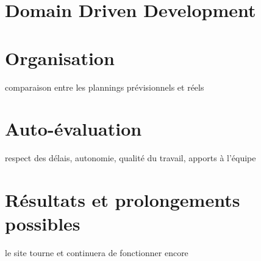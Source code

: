 






\section{Domain Driven Development}


\section{Organisation}
comparaison entre les plannings prévisionnels et réels



\section{Auto-évaluation}
respect des délais, autonomie, qualité du travail, apports à l'équipe


\section{Résultats et prolongements possibles}
le site tourne et continuera de fonctionner encore

